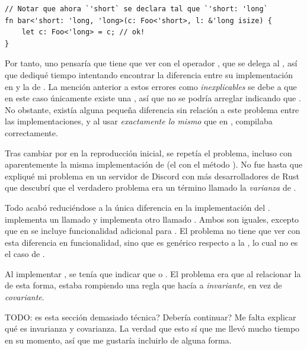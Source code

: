 \begin{verbatim}
// Notar que ahora `'short` se declara tal que `'short: 'long`
fn bar<'short: 'long, 'long>(c: Foo<'short>, l: &'long isize) {
    let c: Foo<'long> = c; // ok!
}
\end{verbatim}

Por tanto, uno pensaría que tiene que ver con el operador \rust{==}, que se
delega al \trait {}, así que dediqué tiempo intentando encontrar
la diferencia entre su implementación en  y la de
. La mención anterior a estos errores como
\emph{inexplicables} se debe a que en este caso únicamente existe una \lifetime
{}, así que no se podría arreglar indicando que . No
obstante, existía alguna pequeña diferencia sin relación a este problema entre
las implementaciones, y al usar \emph{exactamente lo mismo} que en , compilaba correctamente.

Tras cambiar  por  en la reproducción
inicial, se repetía el problema, incluso con aparentemente la misma
implementación de  (el \trait con el método ). No fue hasta
que expliqué mi problema en un servidor de Discord con más desarrolladores de
Rust que descubrí que el verdadero problema era un término llamado la
\emph{varianza} de .

Todo acabó reduciéndose a la única diferencia en la implementación del \trait
{}.  implementa un \trait llamado
 y  implementa otro llamado
. Ambos \traits son iguales, excepto que en 
se incluye funcionalidad adicional para \abistable. El problema no tiene que ver
con esta diferencia en funcionalidad, sino que  es
genérico respecto a la \lifetime {}, lo cual no es el caso de
.

Al implementar , se tenía que indicar que  o . El problema era que al relacionar la \lifetime {} de
esta forma, estaba rompiendo una regla que hacía a 
\emph{invariante}, en vez de \emph{covariante}.

TODO: es esta sección demasiado técnica? Debería continuar? Me falta explicar
qué es invarianza y covarianza. La verdad que esto sí que me llevó mucho tiempo
en su momento, así que me gustaría incluirlo de alguna forma.

